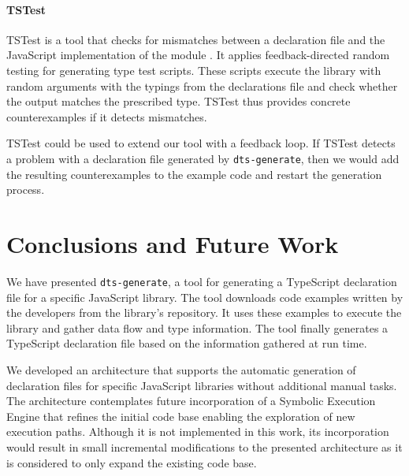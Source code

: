 \documentclass[sigconf]{acmart}
\begin{document}
\paragraph*{TSTest}
TSTest is a tool that checks for mismatches between a declaration file and the JavaScript
implementation of the module \cite{DBLP:journals/pacmpl/KristensenM17}. It applies feedback-directed
random testing for generating type test scripts. These scripts execute the library with
random arguments with the typings from the declarations file and check whether the output
matches the prescribed type. TSTest thus provides concrete counterexamples if it detects mismatches.



TSTest could be used to extend our tool with a feedback loop. If TSTest detects a problem
with a declaration file generated by \texttt{dts-generate}, then we would add the
resulting counterexamples to the example code and restart the generation process. 

\section{Conclusions and Future Work}
\label{sec:conclusion}
We have presented \texttt{dts-generate}, a tool for generating a TypeScript declaration
file for a specific JavaScript library. The tool downloads code examples written by the
developers from the library's repository. It uses these examples to execute the library and
gather data flow and type information. The tool finally generates a TypeScript declaration
file based on the information gathered at run time.

We developed an architecture that supports the automatic generation of declaration files
for specific JavaScript libraries without additional manual tasks. The architecture
contemplates future incorporation of a Symbolic Execution Engine that refines the
initial code base enabling the exploration of new execution paths. Although it is not
implemented 
in this work, its incorporation would result in small incremental modifications to the
presented architecture as it is considered to only expand the existing code base.
\end{document}
